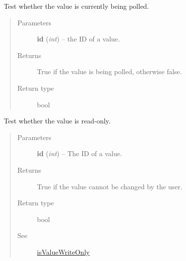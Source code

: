 \documentclass[letterpaper,10pt,english]{sphinxmanual}
\begin{document}
\begin{fulllineitems}
\begin{fulllineitems}
\begin{quote}
\begin{description}
\end{description}\end{quote}

\end{fulllineitems}


\begin{fulllineitems}
\label{libopenzwave:libopenzwave.PyManager.isValuePolled}~\label{libopenzwave:isvaluepolled}
Test whether the value is currently being polled.
\begin{quote}\begin{description}
\item[{Parameters}] \leavevmode
\textbf{id} (\emph{int}) -- the ID of a value.

\item[{Returns}] \leavevmode
True if the value is being polled, otherwise false.

\item[{Return type}] \leavevmode
bool

\end{description}\end{quote}

\end{fulllineitems}


\begin{fulllineitems}
\label{libopenzwave:libopenzwave.PyManager.isValueReadOnly}~\label{libopenzwave:isvaluereadonly}
Test whether the value is read-only.
\begin{quote}\begin{description}
\item[{Parameters}] \leavevmode
\textbf{id} (\emph{int}) -- The ID of a value.

\item[{Returns}] \leavevmode
True if the value cannot be changed by the user.

\item[{Return type}] \leavevmode
bool

\item[{See}] \leavevmode
{\hyperref[libopenzwave:isvaluewriteonly]{isValueWriteOnly}}

\end{description}\end{quote}


\end{fulllineitems}
\end{fulllineitems}
\end{document}
